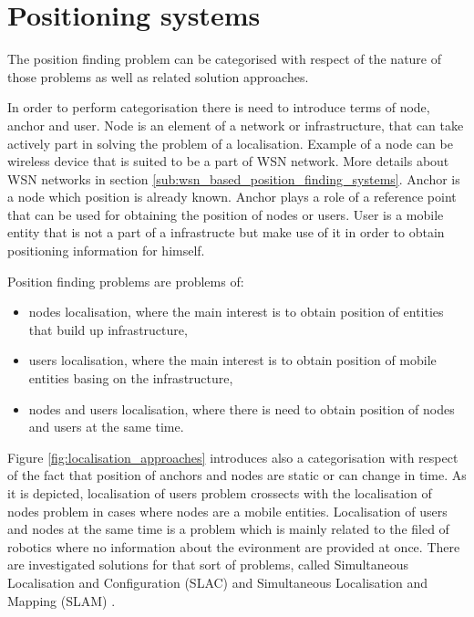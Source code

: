 \documentclass[../main.tex]{subfiles}
\begin{document}
\section{Positioning systems}

The position finding problem can be categorised with respect of the nature of those problems as well as related solution approaches.

In order to perform categorisation there is need to introduce terms of node, anchor and user. Node is an element of a network or infrastructure, that can take actively part in solving the problem of a localisation. Example of a node can be wireless device that is suited to be a part of WSN network. More details about WSN networks in section \ref{sub:wsn_based_position_finding_systems}. Anchor is a node which position is already known. Anchor plays a role of a reference point that can be used for obtaining the position of nodes or users. User is a mobile entity that is not a part of a infrastructe but make use of it in order to obtain positioning information for himself.

Position finding problems are problems of:
\begin{itemize}
 	\item nodes localisation, where the main interest is to obtain position of entities that build up infrastructure,
 	\item users localisation, where the main interest is to obtain position of mobile entities basing on the infrastructure,
 	\item nodes and users localisation, where there is need to obtain position of nodes and users at the same time.
 \end{itemize}
Figure \ref{fig:localisation_approaches} introduces also a categorisation with respect of the fact that position of anchors and nodes are static or can change in time. As it is depicted, localisation of users problem crossects with the localisation of nodes problem in cases where nodes are a mobile entities. Localisation of users and nodes at the same time is a problem which is mainly related to the filed of robotics where no information about the evironment are provided at once. There are investigated solutions for that sort of problems, called Simultaneous Localisation and Configuration (SLAC) and Simultaneous Localisation and Mapping (SLAM) \cite{discover_beacons_and_position}.
\end{document}
